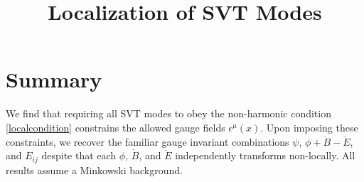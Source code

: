 \documentclass[10pt,letterpaper]{article}
\title{Localization of SVT Modes}
\date{}
\numberwithin{equation}{section}
\begin{document}
 
\maketitle
\noindent 
%
\section*{Summary}
We find that requiring all SVT modes to obey the non-harmonic condition \eqref{localcondition} constrains the allowed gauge fields $\epsilon^\mu(x)$. Upon imposing these constraints, we recover the familiar gauge invariant combinations $\psi$, $\phi + \dot B-\ddot E$, and $E_{ij}$ despite that each $\phi$, $\dot B$, and $\ddot E$ independently transforms non-locally. All results assume a Minkowski background.


\end{document}
